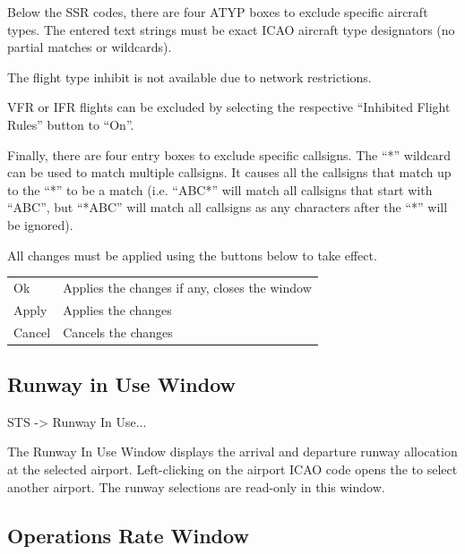\documentclass[a4paper,oneside,11pt]{memoir}
\begin{document}
\bigskip

Below the SSR codes, there are four ATYP boxes to exclude specific aircraft types. The entered text strings must be exact ICAO aircraft type designators (no partial matches or wildcards).

\bigskip

The flight type inhibit is not available due to network restrictions.

\bigskip

VFR or IFR flights can be excluded by selecting the respective “Inhibited Flight Rules” button to “On”.

\bigskip

Finally, there are four entry boxes to exclude specific callsigns. The “*” wildcard can be used to match multiple callsigns. It causes all the callsigns that match up to the “*” to be a match (i.e. “ABC*” will match all callsigns that start with “ABC”, but “*ABC” will match all callsigns as any characters after the “*” will be ignored).

\bigskip

All changes must be applied using the buttons below to take effect.

\bigskip

\begin{longtable}{p{2.5cm} p{10cm}}
    Ok      & Applies the changes if any, closes the window\\
    Apply   & Applies the changes\\
    Cancel  & Cancels the changes\\
\end{longtable}

\subsection{Runway in Use Window}
\label{win:riuw}

 STS -> Runway In Use...

\bigskip


The Runway In Use Window displays the arrival and departure runway allocation at the selected airport. Left-clicking on the airport ICAO code opens the  to select another airport. The runway selections are read-only in this window.

\subsection{Operations Rate Window}
\label{win:orw}
\end{document}
